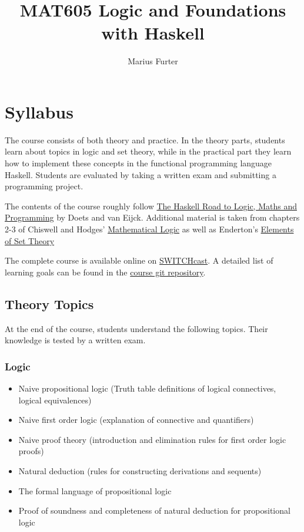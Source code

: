 \documentclass{article}[12pt]
\title{MAT605 Logic and Foundations with Haskell}
\author{Marius Furter}
\begin{document}
\maketitle

\section{Syllabus}
The course consists of both theory and practice. In the theory parts, students learn about topics in logic and set theory, while in the practical part they learn how to implement these concepts in the functional programming language Haskell. Students are evaluated by taking a written exam and submitting a programming project.

The contents of the course roughly follow \href{https://staff.fnwi.uva.nl/d.j.n.vaneijck2/HR/}{The Haskell Road to Logic, Maths and Programming} by Doets and van Eijck. Additional material is taken from chapters 2-3 of Chiswell and Hodges' \href{https://global.oup.com/academic/product/mathematical-logic-9780198571001?cc=nl&lang=en&}{Mathematical Logic} as well as Enderton's \href{https://www.elsevier.com/books/elements-of-set-theory/enderton/978-0-08-057042-6}{Elements of Set Theory}

The complete course is available online on \href{https://uzh.mediaspace.cast.switch.ch/channel/23FS%2BMAT605%2BLogic%2Band%2BFoundations%2Bwith%2BHaskell/32019}{SWITCHcast}. A detailed list of learning goals can be found in the \href{https://github.com/MariusFurter/MAT605-haskell-FS23}{course git repository}.

\subsection{Theory Topics}

At the end of the course, students understand the following topics. Their knowledge is tested by a written exam.
\subsubsection{Logic}
\begin{itemize}
    \item Naive propositional logic (Truth table definitions of logical connectives, logical equivalences)
    \item Naive first order logic (explanation of connective and quantifiers)
    \item Naive proof theory (introduction and elimination rules for first order logic proofs)
    \item Natural deduction (rules for constructing derivations and sequents)
    \item The formal language of propositional logic
    \item Proof of soundness and completeness of natural deduction for propositional logic
\end{itemize}
\end{document}
